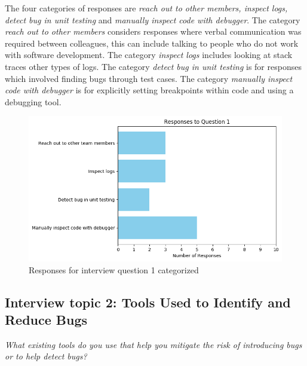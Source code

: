 \documentclass[../main.tex]{subfiles}
\begin{document}
The four categories of responses are \textit{reach out to other  members, inspect logs, detect bug in unit testing} and \textit{manually inspect code with debugger}. The category \textit{reach out to other members} considers responses where verbal communication was required between colleagues, this can include talking to people who do not work with software development. The category \textit{inspect logs} includes looking at stack traces other types of logs. The category \textit{detect bug in unit testing} is for responses which involved finding bugs through test cases. The category \textit{manually inspect code with debugger} is for explicitly setting breakpoints within code and using a debugging tool. 

\begin{figure}[H]
    \centering
    \includegraphics[scale=0.7]{images/Results/RQ2/RQ2_question_1.png}
    \caption{Responses for interview question 1 categorized}
    \label{fig:rq4Image1}
\end{figure}

\subsection{Interview topic 2: Tools Used to Identify and Reduce Bugs}

\textit{What existing tools do you use that help you mitigate the risk of introducing bugs or to help detect bugs?}
\end{document}
